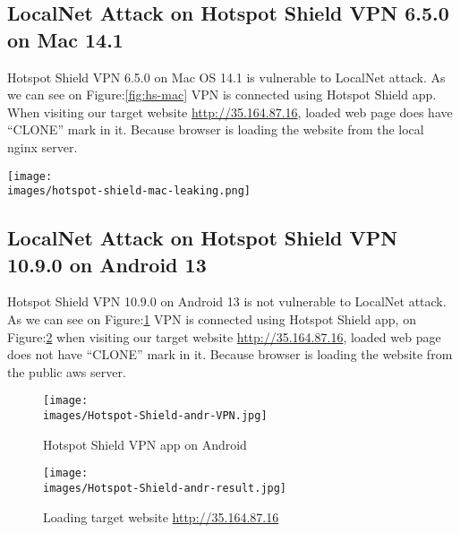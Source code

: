 \documentclass[letterpaper,11pt]{article}
\newcommand{\images}{images}
\newcommand{\fig}{Figure:}
\begin{document}
\subsection{LocalNet Attack on Hotspot Shield VPN 6.5.0 on Mac 14.1}
 Hotspot Shield VPN 6.5.0 on Mac OS 14.1 is vulnerable to LocalNet attack.
As we can see on \fig \ref{fig:hs-mac} VPN is connected using Hotspot Shield app.
When visiting our target website \href{}{http://35.164.87.16},
loaded web page does have ``CLONE'' mark in it.
Because browser is loading the website from the local nginx server.
\begin{figure*}[h]
	\centering
	\texttt{[image: \\images/hotspot-shield-mac-leaking.png]}
	\caption{Hotspot Shield VPN on Mac in vulnerable to LocalNet attack}
	\label{fig:hs-mac}
\end{figure*}

\subsection{LocalNet Attack on Hotspot Shield VPN 10.9.0 on Android 13}
 Hotspot Shield VPN 10.9.0 on Android 13 is not vulnerable to LocalNet attack.
 As we can see on \fig \ref{fig:hs-andr} VPN is connected using Hotspot Shield app,
 on \fig \ref{fig:hs-andr-res} when visiting our target website \href{}{http://35.164.87.16},
 loaded web page does not have ``CLONE'' mark in it.
Because browser is loading the website from the public aws server.
\begin{figure*}[h!]
	\centering
	\begin{subfigure}{0.35\textwidth}
		\centering
		\texttt{[image: \\images/Hotspot-Shield-andr-VPN.jpg]}
		\caption{Hotspot Shield VPN app on Android}
		\label{fig:hs-andr}
	\end{subfigure}
	\begin{subfigure}{0.35\linewidth}
		\centering
		\texttt{[image: \\images/Hotspot-Shield-andr-result.jpg]}
		\caption{Loading target website  \href{}{http://35.164.87.16}}
		\label{fig:hs-andr-res}
	\end{subfigure}
	\caption{Testing Hotspot Shield VPN on Android for LocalNet attack}
	\label{fig:hs-andoird}
\end{figure*}
\end{document}
